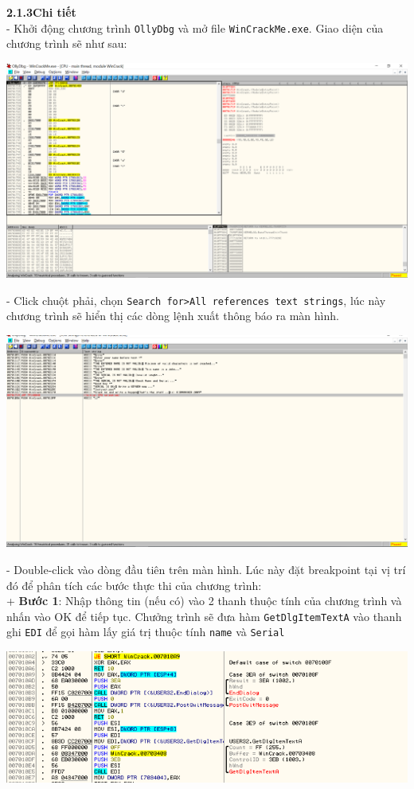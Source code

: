 \noindent\textbf{2.1.3\quad Chi tiết}\\
- Khởi động chương trình \texttt{OllyDbg} và mở file \texttt{WinCrackMe.exe}. Giao diện của chương trình sẽ như sau: 
\begin{center}
    \includegraphics[width=\textwidth]{img/file-2/asm1.PNG}
\end{center}
- Click chuột phải, chọn \texttt{Search for>All references text strings}, lúc này chương trình sẽ hiển thị các dòng lệnh xuất thông báo ra màn hình.\\
\begin{center}
    \includegraphics[width=\textwidth]{img/file-2/asm2.PNG}
\end{center}
- Double-click vào dòng đầu tiên trên màn hình. Lúc này đặt breakpoint tại vị trí đó để phân tích các bước thực thi của chương trình:\\
+ \textbf{Bước 1}: Nhập thông tin (nếu có) vào 2 thanh thuộc tính của chương trình và nhấn vào OK để tiếp tục. Chưởng trình sẽ đưa hàm \texttt{GetDlgItemTextA} vào thanh ghi \texttt{EDI} để gọi hàm lấy giá trị thuộc tính \texttt{name} và \texttt{Serial}\\
\begin{center}
    \includegraphics[width=\textwidth]{img/file-2/asm3.PNG}
\end{center}
